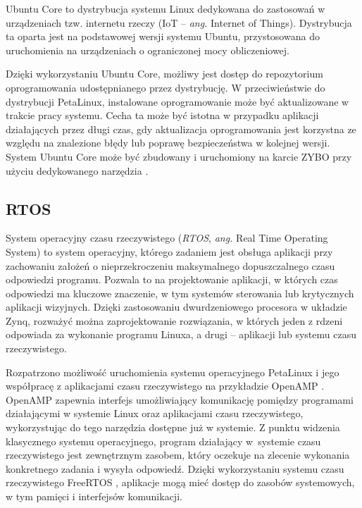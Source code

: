 Ubuntu Core to dystrybucja systemu Linux dedykowana do zastosowań w urządzeniach tzw. internetu rzeczy (IoT -- \emph{ang.} Internet of Things). 
Dystrybucja ta oparta jest na podstawowej wersji systemu Ubuntu, przystosowana do uruchomienia na urządzeniach o ograniczonej mocy obliczeniowej.

Dzięki wykorzystaniu Ubuntu Core, możliwy jest dostęp do repozytorium oprogramowania udostępnianego przez dystrybucję. 
W przeciwieństwie do dystrybucji PetaLinux, instalowane oprogramowanie może być aktualizowane w trakcie pracy systemu. 
Cecha ta może być istotna w przypadku aplikacji działających przez długi czas, gdy aktualizacja oprogramowania jest korzystna ze względu na znalezione błędy lub poprawę bezpieczeństwa w kolejnej wersji. 
System Ubuntu Core może być zbudowany i uruchomiony na karcie ZYBO przy użyciu dedykowanego narzędzia \cite{ubuntu-core-zybo}.


\subsection{RTOS}

System operacyjny czasu rzeczywistego (\emph{RTOS}, \emph{ang.} Real Time Operating System) to system operacyjny, którego zadaniem jest obsługa aplikacji przy zachowaniu założeń o nieprzekroczeniu maksymalnego dopuszczalnego czasu odpowiedzi programu. 
Pozwala to na projektowanie aplikacji, w których czas odpowiedzi ma kluczowe znaczenie, w tym systemów sterowania lub krytycznych aplikacji wizyjnych.
Dzięki zastosowaniu dwurdzeniowego procesora w układzie Zynq, rozważyć można zaprojektowanie rozwiązania, w których jeden z rdzeni odpowiada za wykonanie programu Linuxa, a drugi -- aplikacji lub systemu czasu rzeczywistego.

Rozpatrzono możliwość uruchomienia systemu operacyjnego PetaLinux i jego współpracę z aplikacjami czasu rzeczywistego na przykładzie OpenAMP \cite{openamp-home}. 
OpenAMP zapewnia interfejs umożliwiający komunikację pomiędzy programami działającymi w systemie Linux oraz aplikacjami czasu rzeczywistego, wykorzystując do tego narzędzia dostępne już w systemie.
Z punktu widzenia klasycznego systemu operacyjnego, program działający w~systemie czasu rzeczywistego jest zewnętrznym zasobem, który oczekuje na zlecenie wykonania konkretnego zadania i wysyła odpowiedź.
Dzięki wykorzystaniu systemu czasu rzeczywistego FreeRTOS \cite{freeRTOS-home}, aplikacje mogą mieć dostęp do zasobów systemowych, w tym pamięci i interfejsów komunikacji.

